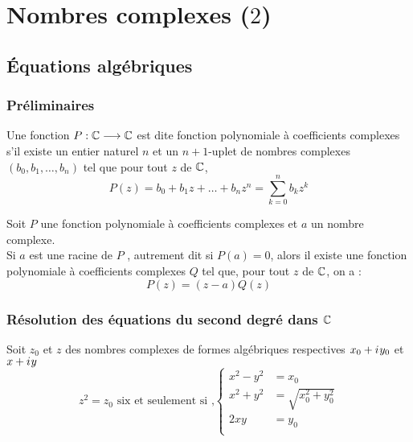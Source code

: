 \chapter{Nombres complexes (\(2\))}

\minitoc

\section{Équations algébriques}
\subsection{Préliminaires}
\begin{defi}
    Une fonction \(P:\mathbb{C}\longrightarrow\mathbb{C}\) est dite fonction polynomiale à coefficients complexes s'il existe un entier naturel \(n\) et un \(n+1\)-uplet de nombres complexes \((b_0,b_1,\dots,b_n)\) tel que pour tout \(z\) de \(\mathbb{C}\), 
    \[P(z) = b_0+b_1z+\dots+b_nz^n = \sum_{k=0}^n b_k z^k\]
\end{defi}
\begin{prop}
    Soit \(P\) une fonction polynomiale à coefficients complexes et \(a\) un nombre complexe.\\
    Si \(a\) est une racine de \(P\) , autrement dit si \(P (a) = 0\), alors il existe une fonction polynomiale à coefficients complexes \(Q\) tel que, pour tout \(z\) de \(\mathbb{C}\), on a :
    \[P(z) = (z-a)Q(z)\]
\end{prop}

\subsection{Résolution des équations du second degré dans \(\mathbb{C}\)}
\begin{defprop} [cas particulier des équations du type \(z^2 = z_0\)]
    Soit \(z_0\) et \(z\) des nombres complexes de formes algébriques respectives \(x_0 + i\mkern1mu y_0\) et \(x+i\mkern1mu y\) 
    \[z^2 = z_0 \text{ six et seulement si ,} 
    \begin{cases}
        x^2-y^2 &= x_0 \\
        x^2+y^2 &= \sqrt{x_0^2 + y_0^2}\\
        2xy &= y_0 \\
    \end{cases}
    \]
\end{defprop}

